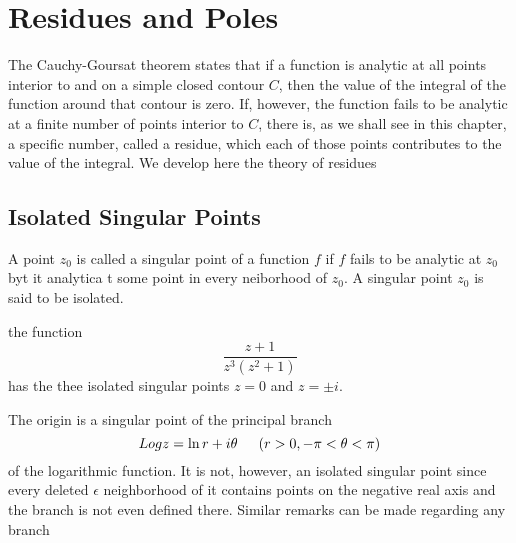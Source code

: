 \chapter{Residues and Poles}
The Cauchy-Goursat theorem states that if a function is analytic at all
points interior to and on a simple closed contour $ C $, then the value of the integral
of the function around that contour is zero. If, however, the function fails to be
analytic at a finite number of points interior to $ C $, there is, as we shall see in this
chapter, a specific number, called a residue, which each of those points contributes
to the value of the integral. We develop here the theory of residues
\section{Isolated Singular Points}
A point $ z_0 $ is called a singular point of a function $ f $ if $ f $ fails to be analytic at $ z_0 $ byt it analytica t some point in every neiborhood of $ z_0 $. A singular point $ z_0 $ is said to be isolated. 
\begin{example}
	the function 
	\[ \dfrac{z+1}{z^3(z^2 + 1)} \] has the thee isolated singular points $ z = 0 $ and $ z = \pm i . $
\end{example}
\begin{example}
	The origin is a singular point of the principal branch 
	\[ Log z = \ln r + i \theta \indent (r > 0, -\pi < \theta < \pi) \] 
	of the logarithmic function. It is not, however, an isolated singular point since every
	deleted $ \epsilon $ neighborhood of it contains points on the negative real axis and the branch is not even defined there. Similar remarks can be made regarding any branch
\end{example}
